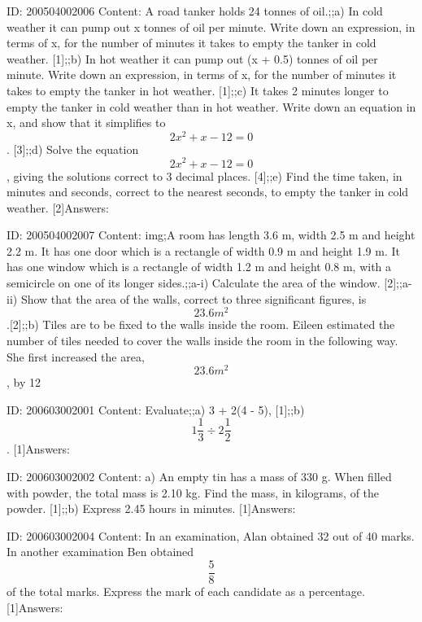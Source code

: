 \documentclass{article}
\begin{document}
ID: 200504002006
Content:
A road tanker holds 24 tonnes of oil.;;a) In cold weather it can pump out x tonnes of oil per minute. Write down an expression, in terms of x, for the number of minutes it takes to empty the tanker in cold weather. [1];;b) In hot weather it can pump out (x + 0.5) tonnes of oil per minute. Write down an expression, in terms of x, for the number of minutes it takes to empty the tanker in hot weather. [1];;c) It takes 2 minutes longer to empty the tanker in cold weather than in hot weather. Write down an equation in x, and show that it simplifies to $$2x^{2} +x-12=0$$. [3];;d) Solve the equation $$2x^{2} +x-12=0$$, giving the solutions correct to 3 decimal places. [4];;e) Find the time taken, in minutes and seconds, correct to the nearest seconds, to empty the tanker in cold weather. [2]Answers:

ID: 200504002007
Content:
img;A room has length 3.6 m, width 2.5 m and height 2.2 m. It has one door which is a rectangle of width 0.9 m and height 1.9 m. It has one window which is a rectangle of width 1.2 m and height 0.8 m, with a semicircle on one of its longer sides.;;a-i) Calculate the area of the window. [2];;a-ii) Show that the area of the walls, correct to three significant figures, is $$23.6 m^{2} $$ .[2];;b) Tiles are to be fixed to the walls inside the room. Eileen estimated the number of tiles needed to cover the walls inside the room in the following way. She first increased the area, $$23.6 m^{2} $$, by 12%

ID: 200603002001
Content:
Evaluate;;a) 3 + 2(4 - 5), [1];;b) $$1\frac{1}{3} \div 2\frac{1}{2}$$. [1]Answers:

ID: 200603002002
Content:
a) An empty tin has a mass of 330 g. When filled with powder, the total mass is 2.10 kg. Find the mass, in kilograms, of the powder. [1];;b) Express 2.45 hours in minutes. [1]Answers:

ID: 200603002004
Content:
In an examination, Alan obtained 32 out of 40 marks. In another examination Ben obtained $$\frac{5}{8}$$ of the total marks. Express the mark of each candidate as a percentage. [1]Answers:
\end{document}
